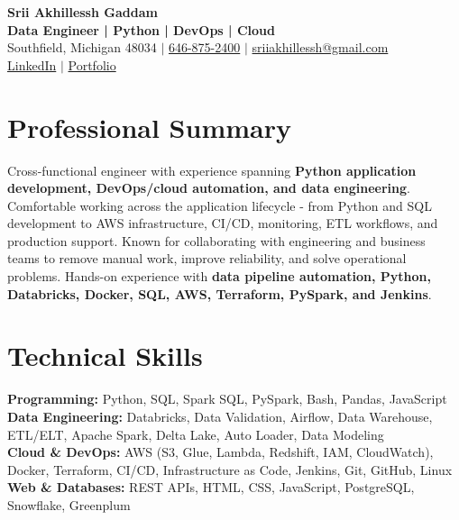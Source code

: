 \documentclass[letterpaper,10pt]{article}
\begin{document}
\fontsize{9.35pt}{10.45pt}\selectfont

\begin{center}
    {\LARGE \textbf{Srii Akhillessh Gaddam}} \\[-1pt]
    \textbf{Data Engineer | Python | DevOps | Cloud} \\[2pt]
    Southfield, Michigan 48034 $|$
    \href{tel:6468752400}{646-875-2400} $|$
    \href{mailto:sriiakhillessh@gmail.com}{sriiakhillessh@gmail.com} \\[1pt]
    \href{https://www.linkedin.com/in/srii-akhiilessh-gaddam-b48668191/}{LinkedIn} $|$
    \href{https://sriiakhillesshg.github.io/portfolio/}{Portfolio}
\end{center}
\vspace{-8pt}

\section{Professional Summary}
\small{Cross-functional engineer with experience spanning \textbf{Python application development, DevOps/cloud automation, and data engineering}. Comfortable working across the application lifecycle - from Python and SQL development to AWS infrastructure, CI/CD, monitoring, ETL workflows, and production support. Known for collaborating with engineering and business teams to remove manual work, improve reliability, and solve operational problems. Hands-on experience with \textbf{data pipeline automation, Python, Databricks, Docker, SQL, AWS, Terraform, PySpark, and Jenkins}.}

\section{Technical Skills}
\small{
\textbf{Programming:} Python, SQL, Spark SQL, PySpark, Bash, Pandas, JavaScript \\
\textbf{Data Engineering:} Databricks, Data Validation, Airflow, Data Warehouse, ETL/ELT, Apache Spark, Delta Lake, Auto Loader, Data Modeling \\
\textbf{Cloud \& DevOps:} AWS (S3, Glue, Lambda, Redshift, IAM, CloudWatch), Docker, Terraform, CI/CD, Infrastructure as Code, Jenkins, Git, GitHub, Linux \\
\textbf{Web \& Databases:} REST APIs, HTML, CSS, JavaScript, PostgreSQL, Snowflake, Greenplum
}
\end{document}
